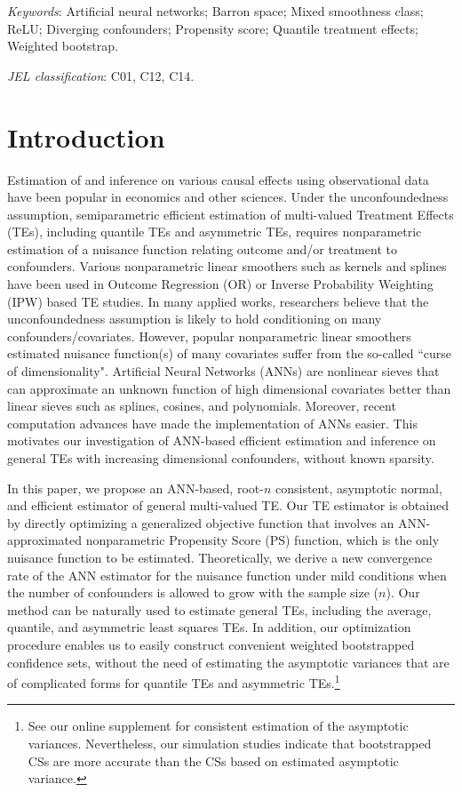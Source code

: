 \documentclass[11pt]{article}
\renewcommand{\thefootnote}{\fnsymbol{footnote}}
\numberwithin{equation}{section}
\begin{document}
\setcounter{section}{0}

\baselineskip0.6cm

{\small \noindent \textit{Keywords}: Artificial neural networks; Barron space; Mixed smoothness class; ReLU; Diverging confounders; Propensity score; Quantile treatment effects; Weighted bootstrap.}

{\small \noindent \textit{JEL classification}: C01, C12, C14.}

\renewcommand\thefootnote{\arabic{footnote}}

\section{Introduction}
Estimation of and inference on various causal effects using observational data have been popular in economics and other sciences. Under the unconfoundedness assumption, semiparametric efficient estimation of multi-valued Treatment Effects (TEs), including quantile TEs and asymmetric TEs, requires nonparametric estimation of a nuisance function relating outcome and/or treatment to confounders. Various nonparametric linear smoothers such as kernels and splines have been used in Outcome Regression (OR) or Inverse Probability Weighting (IPW) based TE studies. In many applied works, researchers believe that the unconfoundedness assumption is likely to hold conditioning on many confounders/covariates. However, popular nonparametric linear smoothers estimated nuisance function(s) of many covariates suffer from the so-called ``curse of dimensionality". Artificial Neural Networks (ANNs) are nonlinear sieves that can approximate an unknown function of high dimensional covariates better than linear sieves such as splines, cosines, and polynomials. Moreover, recent computation advances have made the implementation of ANNs easier. This motivates our investigation of ANN-based efficient estimation and inference on general TEs with increasing dimensional confounders, without known sparsity.

In this paper, we propose an ANN-based, root-$n$ consistent, asymptotic normal, and efficient estimator of general multi-valued TE. Our TE estimator is obtained by directly optimizing a generalized objective function that involves an ANN-approximated nonparametric Propensity Score (PS) function, which is the only nuisance function to be estimated. Theoretically, we derive a new convergence rate of the ANN estimator for the nuisance function under mild conditions when the number of confounders is allowed to grow with the sample size ($n$). Our method can be naturally used to estimate general TEs, including the
average, quantile, and asymmetric least squares TEs. In addition, our optimization
procedure enables us to easily construct  convenient weighted bootstrapped confidence sets,
without the need of estimating the asymptotic variances that are of complicated forms for quantile TEs and asymmetric TEs.\footnote{See our online supplement for consistent estimation of the asymptotic variances. Nevertheless, our simulation studies indicate that bootstrapped CSs are more accurate than the CSs based on estimated asymptotic variance.}
\end{document}
